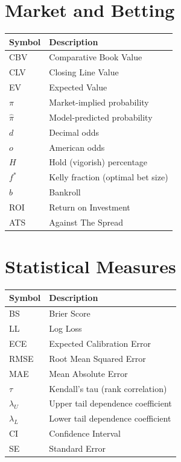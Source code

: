 \section*{Market and Betting}

\begin{tabular}{ll}
\toprule
\textbf{Symbol}  & \textbf{Description} \\
\midrule
CBV & Comparative Book Value \\
CLV & Closing Line Value \\
EV & Expected Value \\
$\pi$ & Market-implied probability \\
$\hat{\pi}$ & Model-predicted probability \\
$d$ & Decimal odds \\
$o$ & American odds \\
$H$ & Hold (vigorish) percentage \\
$f^*$ & Kelly fraction (optimal bet size) \\
$b$ & Bankroll \\
ROI & Return on Investment \\
ATS & Against The Spread \\
\bottomrule
\end{tabular}

\section*{Statistical Measures}

\begin{tabular}{ll}
\toprule
\textbf{Symbol}  & \textbf{Description} \\
\midrule
BS & Brier Score \\
LL & Log Loss \\
ECE & Expected Calibration Error \\
RMSE & Root Mean Squared Error \\
MAE & Mean Absolute Error \\
$\tau$ & Kendall's tau (rank correlation) \\
$\lambda_U$ & Upper tail dependence coefficient \\
$\lambda_L$ & Lower tail dependence coefficient \\
CI & Confidence Interval \\
SE & Standard Error \\
\bottomrule
\end{tabular}

